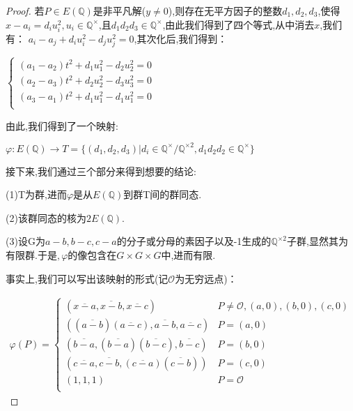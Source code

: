 \documentclass[11pt]{ctexart}
\begin{document}
\begin{proof}

若$P\in E(\mathbb{Q})$是非平凡解($y\neq 0$),则存在无平方因子的整数$d_1,d_2,d_3$,使得$x-a_i=d_iu_i^2,u_i\in\mathbb{Q}^{\times }$,且$d_1d_2d_3\in \mathbb{Q}^{\times }$,由此我们得到了四个等式,从中消去$x$,我们有：
$a_i-a_j+d_iu_i^2-d_ju_j^2=0$,其次化后,我们得到：


\begin{center}
    $ \begin{cases}
        (a_1-a_2)t^2+d_1u_1^2-d_2u_2^2=0\\
            (a_2-a_3)t^2+d_2u_2^2-d_3u_3^2=0\\
            (a_3-a_1)t^2+d_1u_1^2-d_1u_1^2=0\\
            
    \end{cases}$

\end{center}
  
\noindent
由此,我们得到了一个映射:

$\varphi :E(\mathbb{Q})\rightarrow T=\{(d_1,d_2,d_3)|d_i\in \mathbb{Q}^{\times }/\mathbb{Q}^{\times 2},d_1d_2d_2\in\mathbb{Q}^{\times}\}$

\noindent
接下来,我们通过三个部分来得到想要的结论:

(1)T为群,进而$\varphi$是从$E(\mathbb{Q})$到群T间的群同态.

(2)该群同态的核为$2E(\mathbb{Q})$.

(3)设G为$a-b,b-c,c-a$的分子或分母的素因子以及-1生成的$\mathbb{Q}^{\times 2}$子群,显然其为有限群.于是$,\varphi$的像包含在$G\times G\times G$中,进而有限.


事实上,我们可以写出该映射的形式(记$\mathcal{O}$为无穷远点)：

\begin{eqnarray}
    \varphi(P)=
    \begin{cases}
       (\overline{x-a},\overline{x-b},\overline{x-c})&P \neq \mathcal{O},(a,0),(b,0),(c,0) \\
        ((\overline{a-b})(\overline{a-c}),\overline{a-b},\overline{a-c}) &P= (a, 0)\\
        (\overline{b-a},(\overline{b-a})(\overline{b-c}),\overline{b-c}) &P= (b, 0)\\
        (\overline{c-a},\overline{c-b},(\overline{c-a})(\overline{c-b})) &P= (c, 0)\\
        (1,1,1) &P=\mathcal{O}\\
    \end{cases}
\end{eqnarray}


\end{proof}
\end{document}

